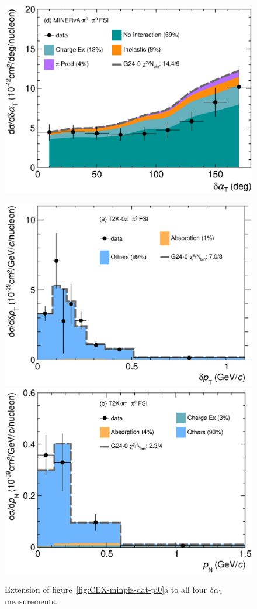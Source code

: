 \begin{figure}[!htb]
    \includegraphics[width=\dbfigwid\textwidth]{figures/tuning/0000-min_pi0_dalphat_pi0_decomp.eps}
    \caption{\label{fig:g24-0-dat-pi0} Extension of figure~\ref{fig:CEX-minpiz-dat-pi0}a to all four $\delta\alpha_\textrm{T}$ measurements. }   		
    \includegraphics[width=\dbfigwid\textwidth]{figures/tuning/0000-t2k_0pi_dpt_pi0_decomp.eps}
    \includegraphics[width=\dbfigwid\textwidth]{figures/tuning/0000-t2k_pip_pn_pi0_decomp.eps}

\end{figure}
